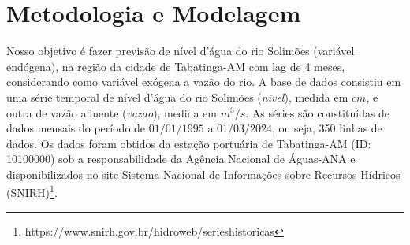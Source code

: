 \documentclass[ 12pt,a4paper ]{article} %
\begin{document}
	
	\section{Metodologia e Modelagem}
	
	Nosso objetivo é fazer previsão de nível d'água do rio Solimões (variável endógena), na região da cidade de Tabatinga-AM com lag de 4 meses, considerando como variável exógena a vazão do rio. A base de dados consistiu em uma série temporal de nível d'água do rio Solimões (\textit{nivel}), medida em $cm$, e outra de vazão afluente (\textit{vazao}), medida em $m^3/s$. As séries são constituídas de dados mensais do período de $01/01/1995$ a $01/03/2024$, ou seja, 350 linhas de dados. Os dados foram obtidos da estação portuária de Tabatinga-AM (ID: 10100000) sob a responsabilidade da Agência Nacional de Águas-ANA e disponibilizados no site Sistema Nacional de Informações sobre Recursos Hídricos (SNIRH)\footnote{ https://www.snirh.gov.br/hidroweb/serieshistoricas}.
	 
\end{document}
